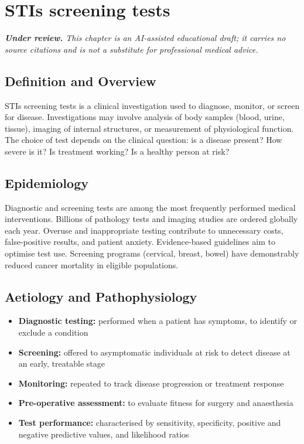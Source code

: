 \chapter{STIs screening tests}

\medskip
\noindent\textit{\textbf{Under review.} This chapter is an AI-assisted educational draft; it carries no source citations and is not a substitute for professional medical advice.}

\section*{Definition and Overview}
STIs screening tests is a clinical investigation used to diagnose, monitor, or screen for disease. Investigations may involve analysis of body samples (blood, urine, tissue), imaging of internal structures, or measurement of physiological function. The choice of test depends on the clinical question: is a disease present? How severe is it? Is treatment working? Is a healthy person at risk?

\section*{Epidemiology}
Diagnostic and screening tests are among the most frequently performed medical interventions. Billions of pathology tests and imaging studies are ordered globally each year. Overuse and inappropriate testing contribute to unnecessary costs, false-positive results, and patient anxiety. Evidence-based guidelines aim to optimise test use. Screening programs (cervical, breast, bowel) have demonstrably reduced cancer mortality in eligible populations.

\section*{Aetiology and Pathophysiology}
\begin{itemize}
    \item \textbf{Diagnostic testing:} performed when a patient has symptoms, to identify or exclude a condition
    \item \textbf{Screening:} offered to asymptomatic individuals at risk to detect disease at an early, treatable stage
    \item \textbf{Monitoring:} repeated to track disease progression or treatment response
    \item \textbf{Pre-operative assessment:} to evaluate fitness for surgery and anaesthesia
    \item \textbf{Test performance:} characterised by sensitivity, specificity, positive and negative predictive values, and likelihood ratios
\end{itemize}

